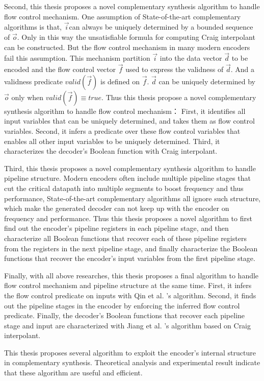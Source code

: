 \begin{eabstract}
Second,
this thesis proposes a novel complementary synthesis algorithm to handle flow control mechanism.
One assumption of State-of-the-art complementary algorithms is that,
$\vec{i}$can always be uniquely determined by a bounded sequence of $\vec{o}$.
Only in this way the unsatisfiable formula for computing Craig interpolant can be constructed.
But the flow control mechanism  in many modern encoders fail this assumption.
This mechanism partition $\vec{i}$ into the data vector $\vec{d}$ to be encoded and the flow control vector $\vec{f}$ used to express the validness of $\vec{d}$.
And a validness predicate $valid(\vec{f})$ is defined on $\vec{f}$.
$\vec{d}$ can be uniquely determined by $\vec{o}$ only when $valid(\vec{f})\equiv true$.
Thus this thesis propose a novel complementary synthesis algorithm to handle flow control mechanism：
First,
it identifies all input variables that can be uniquely determined,
and takes them as flow control variables.
Second,
it infers a predicate over these flow control variables
that enables all other input variables to be uniquely determined.
Third,
it characterizes the decoder's Boolean function with Craig interpolant.



Third,
this thesis proposes a novel complementary synthesis algorithm to handle pipeline structure.
Modern encoders often include multiple pipeline stages that cut the critical datapath into multiple segments
to boost frequency and thus performance,
State-of-the-art complementary algorithms 
all ignore such structure,
which make the generated decoder can not keep up with the encoder on frequency and performance.
Thus this thesis proposes a novel algorithm to first find out the encoder's pipeline registers in each pipeline stage,
and then characterize all Boolean functions that recover each of these pipeline registers
from the registers in the next pipeline stage,
and finally characterize the Boolean functions that recover the encoder's input variables
from the first pipeline stage.


Finally,
with all above researches,
this thesis proposes a final algorithm to handle flow control mechanism and pipeline structure at the same time.
First,
it infers the flow control predicate on inputs with Qin et al. 's algorithm.
Second,
it finds out the pipeline stages in the encoder by enforcing the inferred flow control predicate.
Finally,
the decoder's Boolean functions that recover each pipeline stage and input are characterized with Jiang et al. 's algorithm based on Craig interpolant.

This thesis proposes several algorithm to exploit the encoder's internal structure in complementary synthesis.
Theoretical analysis and experimental result indicate that these algorithm are useful and efficient.
\end{eabstract}

